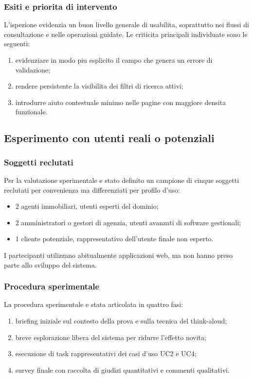 \documentclass[a4paper,11pt]{article}
\begin{document}
\subsubsection{Esiti e priorita di intervento}
L'ispezione evidenzia un buon livello generale di usabilita, soprattutto nei flussi di consultazione e nelle operazioni guidate. Le criticita principali individuate sono le seguenti:
\begin{enumerate}
  \item evidenziare in modo piu esplicito il campo che genera un errore di validazione;
  \item rendere persistente la visibilita dei filtri di ricerca attivi;
  \item introdurre aiuto contestuale minimo nelle pagine con maggiore densita funzionale.
\end{enumerate}

\subsection{Esperimento con utenti reali o potenziali}

\subsubsection{Soggetti reclutati}
Per la valutazione sperimentale e stato definito un campione di cinque soggetti reclutati per convenienza ma differenziati per profilo d'uso:
\begin{itemize}
  \item 2 agenti immobiliari, utenti esperti del dominio;
  \item 2 amministratori o gestori di agenzia, utenti avanzati di software gestionali;
  \item 1 cliente potenziale, rappresentativo dell'utente finale non esperto.
\end{itemize}

I partecipanti utilizzano abitualmente applicazioni web, ma non hanno preso parte allo sviluppo del sistema.

\subsubsection{Procedura sperimentale}
La procedura sperimentale e stata articolata in quattro fasi:
\begin{enumerate}
  \item briefing iniziale sul contesto della prova e sulla tecnica del think-aloud;
  \item breve esplorazione libera del sistema per ridurre l'effetto novita;
  \item esecuzione di task rappresentativi dei casi d'uso UC2 e UC4;
  \item survey finale con raccolta di giudizi quantitativi e commenti qualitativi.
\end{enumerate}
\end{document}

